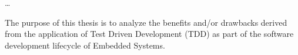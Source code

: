 \dots

The purpose of this thesis is to analyze the benefits and/or drawbacks derived from the application of Test Driven Development (TDD) as part of the software development lifecycle of Embedded Systems.